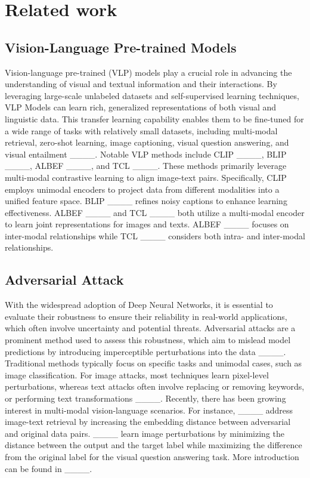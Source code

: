 \section{Related work}
\label{Rel}

\subsection{Vision-Language Pre-trained Models}

Vision-language pre-trained (VLP) models play a crucial role in advancing the understanding of visual and textual information and their interactions. By leveraging large-scale unlabeled datasets and self-supervised learning techniques, VLP Models can learn rich, generalized representations of both visual and linguistic data. This transfer learning capability enables them to be fine-tuned for a wide range of tasks with relatively small datasets, including multi-modal retrieval, zero-shot learning, image captioning, visual question answering, and visual entailment ____. Notable VLP methods include CLIP ____, BLIP ____, ALBEF ____, and TCL ____. These methods primarily leverage multi-modal contrastive learning to align image-text pairs. Specifically, CLIP employs unimodal encoders to project data from different modalities into a unified feature space. BLIP ____ refines noisy captions to enhance learning effectiveness. ALBEF ____ and  TCL ____ both utilize a multi-modal encoder to learn joint representations for images and texts.  ALBEF ____ focuses on inter-modal relationships while  TCL ____ considers both intra- and inter-modal relationships.

\subsection{Adversarial Attack}

With the widespread adoption of Deep Neural Networks, it is essential to evaluate their robustness to ensure their reliability in real-world applications, which often involve uncertainty and potential threats. Adversarial attacks are a prominent method used to assess this robustness, which aim to mislead model predictions by introducing imperceptible perturbations into the data ____. Traditional methods typically focus on specific tasks and unimodal cases, such as image classification. For image attacks, most techniques learn pixel-level perturbations, whereas text attacks often involve replacing or removing keywords, or performing text transformations ____. Recently, there has been growing interest in multi-modal vision-language scenarios. For instance, ____ address image-text retrieval by increasing the embedding distance between adversarial and original data pairs. ____ learn image perturbations by minimizing the distance between the output and the target label while maximizing the difference from the original label for the visual question answering task. More introduction can be found in ____.

